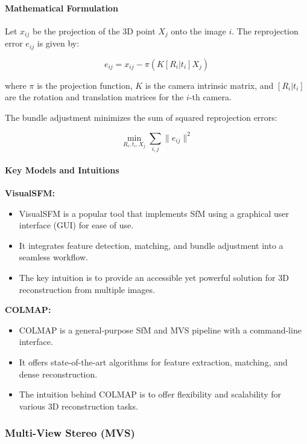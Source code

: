 \documentclass[12pt]{article}
\begin{document}
\paragraph{Mathematical Formulation}

Let \( x_{ij} \) be the projection of the 3D point \( X_j \) onto the image \( i \). The reprojection error \( e_{ij} \) is given by:

\[
e_{ij} = x_{ij} - \pi(K [R_i | t_i] X_j)
\]

where \( \pi \) is the projection function, \( K \) is the camera intrinsic matrix, and \( [R_i | t_i] \) are the rotation and translation matrices for the \( i \)-th camera.

The bundle adjustment minimizes the sum of squared reprojection errors:

\[
\min_{R_i, t_i, X_j} \sum_{i,j} \| e_{ij} \|^2
\]

\paragraph{Key Models and Intuitions}

\textbf{VisualSFM:}
\begin{itemize}
    \item VisualSFM is a popular tool that implements SfM using a graphical user interface (GUI) for ease of use.
    \item It integrates feature detection, matching, and bundle adjustment into a seamless workflow.
    \item The key intuition is to provide an accessible yet powerful solution for 3D reconstruction from multiple images.
\end{itemize}

\textbf{COLMAP:}
\begin{itemize}
    \item COLMAP is a general-purpose SfM and MVS pipeline with a command-line interface.
    \item It offers state-of-the-art algorithms for feature extraction, matching, and dense reconstruction.
    \item The intuition behind COLMAP is to offer flexibility and scalability for various 3D reconstruction tasks.
\end{itemize}

\subsubsection{Multi-View Stereo (MVS)}
\end{document}
